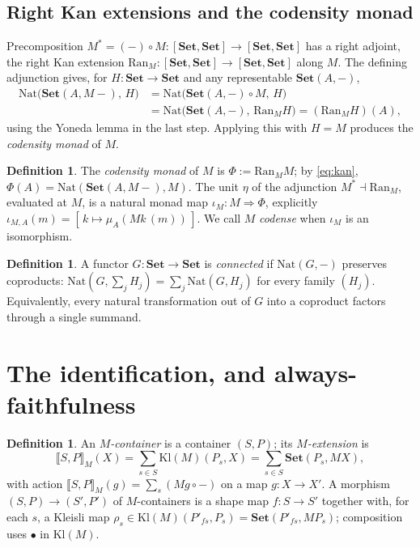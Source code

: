 \documentclass[11pt]{amsart}
\theoremstyle{plain}
\theoremstyle{definition}
\newtheorem{definition}[theorem]{Definition}
\newcommand{\Set}{\mathbf{Set}}
\newcommand{\Kl}{\mathrm{Kl}}
\newcommand{\Nat}{\mathrm{Nat}}
\newcommand{\Ran}{\mathrm{Ran}}
\newcommand{\extM}[1]{\llbracket #1 \rrbracket_{M}}
\begin{document}
\subsection{Right Kan extensions and the codensity monad}
Precomposition $M^{*}=(-)\circ M\colon[\Set,\Set]\to[\Set,\Set]$ has a right adjoint, the right Kan
extension $\Ran_M\colon[\Set,\Set]\to[\Set,\Set]$ along $M$. The defining adjunction gives, for
$H\colon\Set\to\Set$ and any representable $\Set(A,-)$,
\begin{equation}\label{eq:kan}
\begin{aligned}
  \Nat\bigl(\Set(A,M{-}),\,H\bigr)
  &=\Nat\bigl(\Set(A,-)\circ M,\,H\bigr)\\
  &=\Nat\bigl(\Set(A,-),\,\Ran_M H\bigr)=(\Ran_M H)(A),
\end{aligned}
\end{equation}
using the Yoneda lemma in the last step. Applying this with $H=M$ produces the \emph{codensity
monad} of $M$.

\begin{definition}\label{def:codense}
The \emph{codensity monad} of $M$ is $\Phi:=\Ran_M M$; by \eqref{eq:kan},
$\Phi(A)=\Nat(\Set(A,M{-}),M)$. The unit $\eta$ of the adjunction $M^{*}\dashv\Ran_M$, evaluated at
$M$, is a natural monad map $\iota_M\colon M\Rightarrow\Phi$, explicitly
$\iota_{M,A}(m)=[\,k\mapsto\mu_A(Mk\,(m))\,]$. We call $M$ \emph{codense} when $\iota_M$ is an
isomorphism.
\end{definition}

\begin{definition}\label{def:connected}
A functor $G\colon\Set\to\Set$ is \emph{connected} if $\Nat(G,-)$ preserves coproducts:
$\Nat(G,\sum_j H_j)=\sum_j\Nat(G,H_j)$ for every family $(H_j)$. Equivalently, every natural
transformation out of $G$ into a coproduct factors through a single summand.
\end{definition}

\section{The identification, and always-faithfulness}\label{sec:identify}

\begin{definition}\label{def:mcont}
An \emph{$M$-container} is a container $(S,P)$; its \emph{$M$-extension} is
\[
  \extM{S,P}(X)=\sum_{s\in S}\Kl(M)(P_s,X)=\sum_{s\in S}\Set(P_s,MX),
\]
with action $\extM{S,P}(g)=\sum_s(Mg\circ-)$ on a map $g\colon X\to X'$.
A morphism $(S,P)\to(S',P')$ of $M$-containers is a shape map $f\colon S\to S'$ together with, for
each $s$, a Kleisli map $\rho_s\in\Kl(M)(P'_{fs},P_s)=\Set(P'_{fs},MP_s)$; composition uses
$\bullet$ in $\Kl(M)$.
\end{definition}
\end{document}

